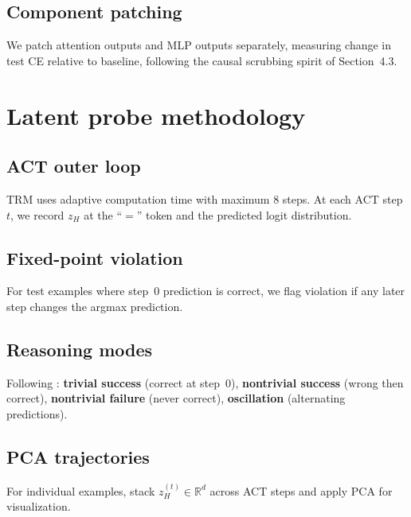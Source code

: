 \subsection{Component patching}
We patch attention outputs and MLP outputs separately, measuring change in test CE relative to baseline, following the causal scrubbing spirit of \citet{nanda2023progress} Section~4.3.

\section{Latent probe methodology}
\label{app:latent_methods}

\subsection{ACT outer loop}
TRM uses adaptive computation time with maximum 8 steps.
At each ACT step $t$, we record $z_H$ at the ``$=$'' token and the predicted logit distribution.

\subsection{Fixed-point violation}
For test examples where step~0 prediction is correct, we flag violation if any later step changes the argmax prediction.

\subsection{Reasoning modes}
Following \citet{ren2026reasoning}: \textbf{trivial success} (correct at step~0), \textbf{nontrivial success} (wrong then correct), \textbf{nontrivial failure} (never correct), \textbf{oscillation} (alternating predictions).

\subsection{PCA trajectories}
For individual examples, stack $z_H^{(t)} \in \mathbb{R}^d$ across ACT steps and apply PCA for visualization.
